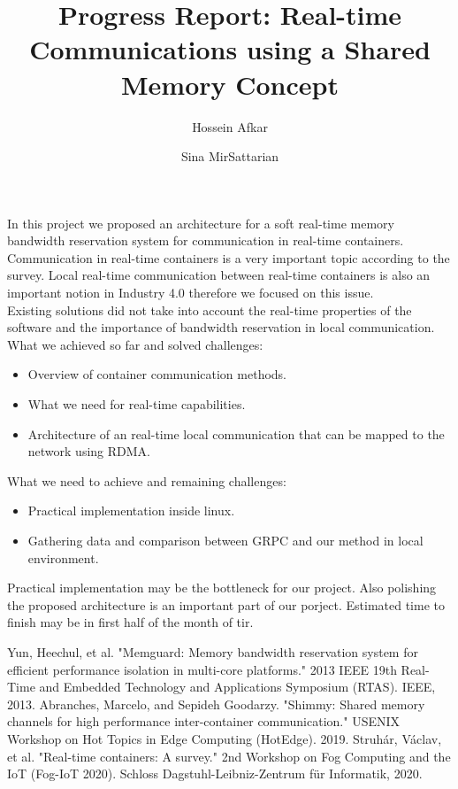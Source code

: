 \documentclass[a4paper, 10pt]{article}
\title{
    Progress Report:
    Real-time Communications using a Shared Memory Concept
}
\author{Hossein Afkar \and Sina MirSattarian}
\theoremstyle{nonumberplain}
\begin{document}
\maketitle
In this project we proposed an architecture for a soft real-time memory
bandwidth reservation system for communication in real-time containers.
Communication in real-time containers is a very important topic according
to the survey\cite{survey}. Local real-time communication between real-time
containers is also an important notion in Industry 4.0 therefore we focused on
this issue. \\
Existing solutions did not take into account the real-time properties of the
software and the importance of bandwidth reservation in local communication. \\
What we achieved so far and solved challenges:
\begin{itemize}
    \item Overview of container communication methods.
    \item What we need for real-time capabilities.
    \item Architecture of an real-time local communication that can be mapped
        to the network using RDMA.
\end{itemize}

What we need to achieve and remaining challenges:
\begin{itemize}
    \item Practical implementation inside linux.
    \item Gathering data and comparison between GRPC and our method in local
        environment.
\end{itemize}

Practical implementation may be the bottleneck for our project.
Also polishing the proposed architecture is an important part of our porject.
Estimated time to finish may be in first half of the month of tir.


% 

\begin{thebibliography}{3}
     Yun, Heechul, et al.
        "Memguard: Memory bandwidth reservation system for efficient
        performance isolation in multi-core platforms." 2013 IEEE 19th
        Real-Time and Embedded Technology and Applications Symposium (RTAS).
        IEEE, 2013.
     Abranches, Marcelo, and Sepideh Goodarzy.
        "Shimmy: Shared memory channels for high performance inter-container
        communication." USENIX Workshop on Hot Topics in Edge Computing
        (HotEdge). 2019.
        Struhár, Václav, et al. "Real-time containers: A survey."
        2nd Workshop on Fog Computing and the IoT (Fog-IoT 2020).
        Schloss Dagstuhl-Leibniz-Zentrum für Informatik, 2020.
\end{thebibliography}
\end{document}
